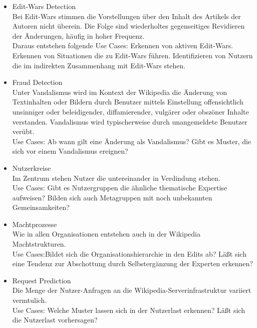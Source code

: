 \begin{itemize}
    \item Edit-Wars Detection\\ Bei Edit-Wars stimmen die Vorstellungen über den Inhalt des Artikels der Autoren nicht überein. Die Folge sind wiederholtes gegenseitiges Revidieren der Änderungen, häufig in hoher Frequenz.\cite{wikipedia.}\\ Daraus entstehen folgende Use Cases: Erkennen von aktiven Edit-Wars. Erkennen von Situationen die zu Edit-Wars führen. Identifizieren von Nutzern die im indirekten Zusammenhang mit Edit-Wars stehen.
    \item Fraud Detection\\Unter Vandalismus wird im Kontext der Wikipedia die Änderung von Textinhalten oder Bildern durch Benutzer mittels Einstellung offensichtlich unsinniger oder beleidigender, diffamierender, vulgärer oder obszöner Inhalte verstanden. Vandalismus wird typischerweise durch unangemeldete Benutzer verübt.\cite{wikipedia.} \\Use Cases: Ab wann gilt eine Änderung als Vandalismus? Gibt es Muster, die sich vor einem Vandalismus ereignen? 
    \item Nutzerkreise\\Im Zentrum stehen Nutzer die untereinander in Verdindung stehen.\\Use Cases: Gibt es Nutzergruppen die ähnliche thematische Expertise aufweisen? Bilden sich auch Metagruppen mit noch unbekannten Gemeinsamkeiten?
    \item Machtprozesse\\Wie in allen Organisationen entstehen auch in der Wikipedia Machtstrukturen.\\Use Cases:Bildet sich die Organisationshierarchie in den Edits ab? Läßt sich eine Tendenz zur Abschottung durch Selbstergänzung der Experten erkennen?\cite{wikipedia.}
    \item Request Prediction\\Die Menge der Nutzer-Anfragen an die Wikipedia-Serverinfrastruktur variiert vermtulich.\\Use Cases: Welche Muster lassen sich in der Nutzerlast erkennen? Läßt sich die Nutzerlast vorhersagen?
\end{itemize}

